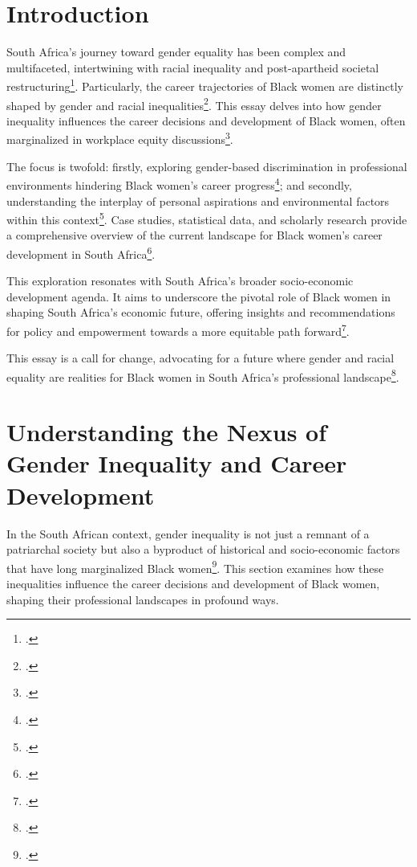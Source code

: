 \documentclass{article}
\begin{document}
\maketitle

\section{Introduction}
South Africa's journey toward gender equality has been complex and multifaceted, intertwining with racial inequality and post-apartheid societal restructuring\footcite{francis2022black}. Particularly, the career trajectories of Black women are distinctly shaped by gender and racial inequalities\footcite{rensburg2021doing}. This essay delves into how gender inequality influences the career decisions and development of Black women, often marginalized in workplace equity discussions\footcite{dosunmu2022discourse}.

The focus is twofold: firstly, exploring gender-based discrimination in professional environments hindering Black women's career progress\footcite{francis2022black}; and secondly, understanding the interplay of personal aspirations and environmental factors within this context\footcite{dosunmu2022discourse}. Case studies, statistical data, and scholarly research provide a comprehensive overview of the current landscape for Black women's career development in South Africa\footcite{rensburg2021doing}.

This exploration resonates with South Africa's broader socio-economic development agenda. It aims to underscore the pivotal role of Black women in shaping South Africa's economic future, offering insights and recommendations for policy and empowerment towards a more equitable path forward\footcite{dosunmu2022discourse}.

This essay is a call for change, advocating for a future where gender and racial equality are realities for Black women in South Africa's professional landscape\footcite{francis2022black}.


\section{Understanding the Nexus of Gender Inequality and Career Development}

In the South African context, gender inequality is not just a remnant of a patriarchal society but also a byproduct of historical and socio-economic factors that have long marginalized Black women\footcite{botha2012progress, nattrass2016two}. This section examines how these inequalities influence the career decisions and development of Black women, shaping their professional landscapes in profound ways.
\end{document}
